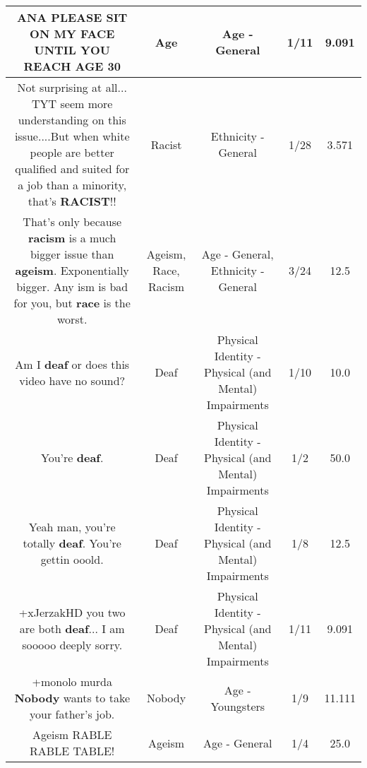 \documentclass[11pt]{article}
\newlength\mylength
\begin{document}
\begin{center}
\begin{longtable}{|C{.65\mylength}|C{.30\mylength}|C{.12\mylength}|C{.12\mylength}|C{.12\mylength}|}
  \small ANA PLEASE SIT ON MY FACE UNTIL YOU REACH \textbf{AGE} 30\normalsize   & Age & Age - General & 1/11 & 9.091 \\  \hline
  \small Not surprising at all... TYT seem more understanding on this issue....But when white people are better qualified and suited for a job than a minority, that's \textbf{RACIST}!!\normalsize   & Racist & Ethnicity - General & 1/28 & 3.571 \\  \hline
  \small That's only because \textbf{racism} is a much bigger issue than \textbf{ageism}. Exponentially bigger. Any ism is bad for you, but \textbf{race} is the worst.\normalsize   & Ageism, Race, Racism & Age - General, Ethnicity - General & 3/24 & 12.5 \\  \hline
  \small Am I \textbf{deaf} or does this video have no sound?\normalsize   & Deaf & Physical Identity - Physical (and Mental) Impairments & 1/10 & 10.0 \\  \hline
  \small You're \textbf{deaf}.\normalsize   & Deaf & Physical Identity - Physical (and Mental) Impairments & 1/2 & 50.0 \\  \hline
  \small Yeah man, you're totally \textbf{deaf}. You're gettin ooold.\normalsize   & Deaf & Physical Identity - Physical (and Mental) Impairments & 1/8 & 12.5 \\  \hline
  \small +xJerzakHD you two are both \textbf{deaf}... I am sooooo deeply sorry.\normalsize   & Deaf & Physical Identity - Physical (and Mental) Impairments & 1/11 & 9.091 \\  \hline
  \small +monolo murda \textbf{Nobody} wants to take your father's job.\normalsize   & Nobody & Age - Youngsters & 1/9 & 11.111 \\  \hline
  \small Ageism RABLE RABLE TABLE!\normalsize   & Ageism & Age - General & 1/4 & 25.0 \\  \hline
  
\end{longtable}
\end{center}
\end{document}

